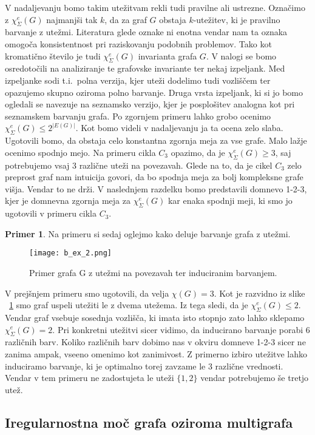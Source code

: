 \documentclass[12pt,a4paper,twoside]{article}
\theoremstyle{definition} %
\newtheorem{primer}[definicija]{Primer}
\theoremstyle{plain} %
\newcommand{\ec}{\chi_{\Sigma}^e}
\numberwithin{equation}{section}  %
\begin{document}
V nadaljevanju bomo takim utežitvam rekli tudi pravilne ali ustrezne. Označimo z $\ec(G)$ najmanjši tak $k$, da za graf $G$ obstaja $k$-utežitev, ki je pravilno barvanje z utežmi. Literatura glede oznake ni enotna vendar nam ta oznaka omogoča konsistentnost pri raziskovanju podobnih problemov. Tako kot kromatično število je tudi $\ec(G)$ invarianta grafa $G$. V nalogi se bomo osredotočili na analiziranje te grafovske invariante ter nekaj izpeljank. Med izpeljanke sodi t.i.\ polna verzija, kjer uteži dodelimo tudi vozliščem ter opazujemo skupno oziroma polno barvanje. Druga vrsta izpeljank, ki si jo bomo ogledali se navezuje na seznamsko verzijo, kjer je posplošitev analogna kot pri seznamskem barvanju grafa. Po zgornjem primeru lahko grobo ocenimo $\ec(G) \le 2^{|E(G)|}$. Kot bomo videli v nadaljevanju ja ta ocena zelo slaba. Ugotovili bomo, da obstaja celo konstantna zgornja meja za vse grafe. Malo lažje ocenimo spodnjo mejo. Na primeru cikla $C_3$ opazimo, da je $\ec(G) \ge 3$, saj potrebujemo vsaj 3 različne uteži na povezavah. Glede na to, da je cikel $C_3$ zelo preprost graf nam intuicija govori, da bo spodnja meja za bolj kompleksne grafe višja. Vendar to ne drži. V naslednjem razdelku bomo predstavili domnevo 1-2-3, kjer je domnevna zgornja meja za $\ec(G)$ kar enaka spodnji meji, ki smo jo ugotovili v primeru cikla $C_3$.

\begin{primer}
Na primeru si sedaj oglejmo kako deluje barvanje grafa z utežmi.
 \begin{figure}[h!]
\caption{Primer grafa G z utežmi na povezavah ter induciranim barvanjem.}
\label{basic_ex1}
\centering
    \texttt{[image: b\_ex\_2.png]}
    \end{figure}
V prejšnjem primeru smo ugotovili, da velja $\chi(G) = 3$. Kot je razvidno iz slike ~\ref{basic_ex1} smo graf uspeli utežiti le z dvema utežema. Iz tega sledi, da je $\ec(G) \le 2$. Vendar graf vsebuje sosednja vozlišča, ki imata isto stopnjo zato lahko sklepamo $\ec(G) = 2$. Pri konkretni utežitvi sicer vidimo, da inducirano barvanje porabi $6$ različnih barv. Koliko različnih barv dobimo nas v okviru domneve 1-2-3 sicer ne zanima ampak, vseeno omenimo kot zanimivost. Z primerno izbiro utežitve lahko induciramo barvanje, ki je optimalno torej zavzame le $3$ različne vrednosti. Vendar v tem primeru ne zadostujeta le uteži $\{1,2\}$ vendar potrebujemo še tretjo utež.
\end{primer}

\subsection{Iregularnostna moč grafa oziroma multigrafa}
\end{document}
